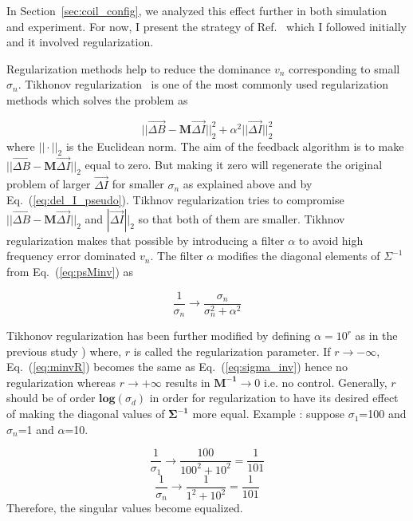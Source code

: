 In Section~\ref{sec:coil_config}, we analyzed this effect further in both simulation and experiment. For now, I present the strategy of Ref.~\cite{bea} which I followed initially and it involved regularization.

Regularization methods help to reduce the dominance $v_n$ corresponding to small $\sigma_n$. Tikhonov regularization~\cite{tikhonov2013numerical,tikhonov_book,svd,svd3} is one of the most commonly used regularization methods which solves the problem as 

\begin{equation}
    ||\Vec{\Delta B}-\bm{M}\Vec{\Delta I}||_2^2+{\alpha}^2||\Vec{\Delta I}||_2^2
\end{equation}
where $||\cdot ||_2$ is the Euclidean norm. The aim of the feedback algorithm is to make $||\Vec{\Delta B}-\bm{M}\Vec{\Delta I}||_2$ equal to zero. But making it zero will regenerate the original problem of larger $\Vec{\Delta I}$ for smaller $\sigma_n$ as explained above and by Eq.~(\ref{eq:del_I_pseudo}). Tikhnov regularization tries to compromise $||\Vec{\Delta B}-\bm{M}\Vec{\Delta I}||_2$ and $|\Vec{\Delta I}||_2$ so that both of them are smaller. Tikhnov regularization makes that possible by introducing a filter $\alpha$ to avoid high frequency error dominated $v_n$. The filter $\alpha$ modifies the diagonal elements of $\Sigma^{-1}$ from Eq.~(\ref{eq:psMinv}) as

\begin{equation}\label{eq:minvR}
    \frac{1}{\sigma_n} \rightarrow \frac{\sigma_n}{\sigma_n^2+\alpha^2} 
\end{equation}

Tikhonov regularization has been further modified by defining $\alpha=10^r$ as in the previous study \cite{bea}) where, $r$ is called the regularization parameter. If  $r \rightarrow - \infty$, Eq.~(\ref{eq:minvR}) becomes the same as Eq.~(\ref{eq:sigma_inv}) hence no regularization whereas $r \rightarrow + \infty$ results in $\bm{M^{-1}} \rightarrow 0$ i.e. no control. Generally, $r$ should be of order $\mathbf{log}(\sigma_{d})$ in order for regularization to have its desired effect of making the diagonal values of $\bm{\Sigma^{-1}}$ more equal. Example : suppose $\sigma_1$=100 and $\sigma_n$=1 and $\alpha$=10.

\begin{equation*}
    \frac{1}{\sigma_1} \rightarrow \frac{100}{100^2+10^2}=\frac{1}{101} 
\end{equation*}
\begin{equation*}
    \frac{1}{\sigma_n} \rightarrow \frac{1}{1^2+10^2}=\frac{1}{101} 
\end{equation*}
Therefore, the singular values become equalized.

